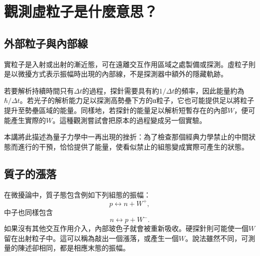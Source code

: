 \section{觀測虛粒子是什麼意思？}

\subsection{外部粒子與內部線}

實粒子是入射或出射的漸近態，可在遠離交互作用區域之處製備或探測。虛粒子則是以微擾方式表示振幅時出現的內部線，不是探測器中額外的隱藏軌跡。

\begin{classroomqa}
\end{classroomqa}

若要解析持續時間只有\(\Delta t\)的過程，探針需要具有約\(1/\Delta t\)的頻率，因此能量約為\(\hbar/\Delta t\)。若光子的解析能力足以探測高勢壘下方的{\proseunicodefont α}粒子，它也可能提供足以將粒子提升至勢壘區域的能量。同樣地，若探針的能量足以解析短暫存在的內部\(W\)，便可能產生實際的\(W\)。這種觀測嘗試會把原本的過程變成另一個實驗。

本講將此描述為量子力學中一再出現的挫折：為了檢查那個經典力學禁止的中間狀態而進行的干預，恰恰提供了能量，使看似禁止的組態變成實際可產生的狀態。

\subsection{質子的漲落}

在微擾論中，質子態包含例如下列組態的振幅：
\begin{equation}
  p\longleftrightarrow n+W^+,
\end{equation}
中子也同樣包含
\begin{equation}
  n\longleftrightarrow p+W^-.
\end{equation}
如果沒有其他交互作用介入，內部玻色子就會被重新吸收。硬探針則可能使一個\(W\)留在出射粒子中。這可以稱為敲出一個漲落，或產生一個\(W\)。說法雖然不同，可測量的陳述卻相同，都是相應末態的振幅。

\begin{classroomqa}
\end{classroomqa}

